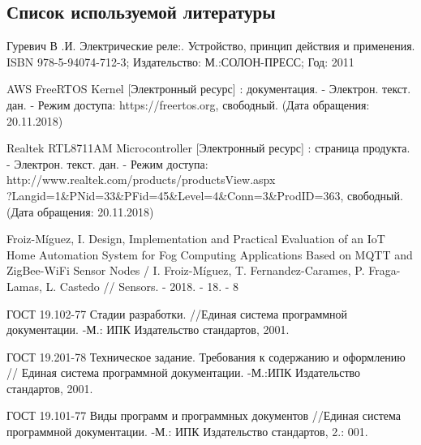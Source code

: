 \subsection{ Список используемой литературы}
\begin{my_enumerate}

\item
Гуревич В .И. Электрические реле:. Устройство, принцип действия и применения. ISBN 978-5-94074-712-3; Издательство: М.:СОЛОН-ПРЕСС; Год: 2011 \\

\item
AWS FreeRTOS Kernel  [Электронный ресурс] : документация. - Электрон. текст. дан. - Режим доступа: https://freertos.org, свободный. (Дата обращения: 20.11.2018) \\

\item 	
Realtek RTL8711AM Microcontroller [Электронный ресурс] : страница продукта. - Электрон. текст. дан. - Режим доступа: http://www.realtek.com/products/productsView.aspx \\ 
?Langid=1\&PNid=33\&PFid=45\&Level=4\&Conn=3\&ProdID=363, свободный. (Дата обращения: 20.11.2018) \\

\item Froiz-Míguez, I. Design, Implementation and Practical Evaluation of an IoT Home Automation System for Fog Computing Applications Based on MQTT and ZigBee-WiFi Sensor Nodes / I. Froiz-Míguez, T. Fernandez-Carames, P. Fraga-Lamas, L. Castedo // Sensors. - 2018. - 18. - 8

\item
ГОСТ 19.102-77 Стадии разработки. //Единая система программной документации. -М.: ИПК Издательство стандартов, 2001.

\item
ГОСТ 19.201-78 Техническое задание. Требования к содержанию и оформлению // Единая система программной документации. -М.:ИПК Издательство стандартов, 2001.

\item
ГОСТ 19.101-77 Виды программ и программных документов //Единая система программной документации. -М.: ИПК Издательство стандартов, 2.: 001.


\end{my_enumerate}

